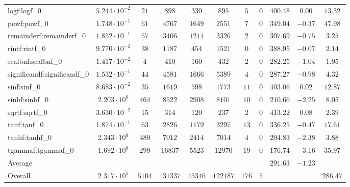 \begin{tabular}{|l|c|c|c|c|c|c|c|c|c|c|}
logf:logf\_0                 & $ 5.244 \cdot 10^{-2} $ & $ 21     $ & $ 898    $ & $ 330   $ & $ 895    $ & $ 5   $ & $ 0 $ & $ 400.48      $ & $ 0.00    $ & $ 13.32   $ \\
powf:powf\_0                 & $ 1.748 \cdot 10^{-1} $ & $ 61     $ & $ 4767   $ & $ 1649  $ & $ 2551   $ & $ 7   $ & $ 0 $ & $ 349.04      $ & $ -0.37   $ & $ 47.98   $ \\
remainderf:remainderf\_0     & $ 1.852 \cdot 10^{-1} $ & $ 57     $ & $ 3466   $ & $ 1211  $ & $ 3326   $ & $ 2   $ & $ 0 $ & $ 307.69      $ & $ -0.75   $ & $ 3.25    $ \\
rintf:rintf\_0               & $ 9.770 \cdot 10^{-2} $ & $ 38     $ & $ 1187   $ & $ 454   $ & $ 1521   $ & $ 0   $ & $ 0 $ & $ 388.95      $ & $ -0.07   $ & $ 2.14    $ \\
scalbnf:scalbnf\_0           & $ 1.417 \cdot 10^{-2} $ & $ 4      $ & $ 410    $ & $ 160   $ & $ 432    $ & $ 2   $ & $ 0 $ & $ 282.25      $ & $ -1.04   $ & $ 1.95    $ \\
significandf:significandf\_0 & $ 1.532 \cdot 10^{-1} $ & $ 44     $ & $ 4581   $ & $ 1666  $ & $ 5389   $ & $ 4   $ & $ 0 $ & $ 287.27      $ & $ -0.98   $ & $ 4.32    $ \\
sinf:sinf\_0                 & $ 8.683 \cdot 10^{-2} $ & $ 35     $ & $ 1619   $ & $ 598   $ & $ 1773   $ & $ 11  $ & $ 0 $ & $ 403.06      $ & $ 0.02    $ & $ 12.87   $ \\
sinhf:sinhf\_0               & $ 2.203 \cdot 10^{0}  $ & $ 464    $ & $ 8522   $ & $ 2908  $ & $ 8101   $ & $ 10  $ & $ 0 $ & $ 210.66      $ & $ -2.25   $ & $ 8.05    $ \\
sqrtf:sqrtf\_0               & $ 3.630 \cdot 10^{-2} $ & $ 15     $ & $ 314    $ & $ 120   $ & $ 237    $ & $ 2   $ & $ 0 $ & $ 413.22      $ & $ 0.08    $ & $ 2.39    $ \\
tanf:tanf\_0                 & $ 1.874 \cdot 10^{-1} $ & $ 63     $ & $ 2826   $ & $ 1179  $ & $ 3297   $ & $ 13  $ & $ 0 $ & $ 336.25      $ & $ -0.47   $ & $ 17.61   $ \\
tanhf:tanhf\_0               & $ 2.343 \cdot 10^{0}  $ & $ 480    $ & $ 7012   $ & $ 2414  $ & $ 7014   $ & $ 4   $ & $ 0 $ & $ 204.83      $ & $ -2.38   $ & $ 3.88    $ \\
tgammaf:tgammaf\_0           & $ 1.692 \cdot 10^{0}  $ & $ 299    $ & $ 16837  $ & $ 5523  $ & $ 12970  $ & $ 19  $ & $ 0 $ & $ 176.74      $ & $ -3.16   $ & $ 35.97   $ \\
\hline
Average                      & $                     $ & $        $ & $        $ & $       $ & $        $ & $     $ & $   $ & $ 291.63      $ & $ -1.23   $ & $         $ \\
\hline
Overall                      & $ 2.317 \cdot 10^{1}  $ & $ 5104   $ & $ 131337 $ & $ 45346 $ & $ 122187 $ & $ 176 $ & $ 5 $ & $             $ & $         $ & $ 286.47  $ \\
\hline
\end{tabular}
